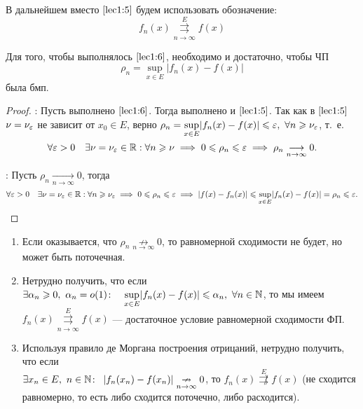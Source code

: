 \documentclass[../../main.tex]{subfiles}
\begin{document}
В дальнейшем вместо $\eqref{lec1:5}$ будем использовать обозначение:
\begin{equation}
\label{lec1:6}
f_n(x) \overset{E}{\underset{n \to \infty}\rightrightarrows} f(x)
\end{equation}
\begin{thm} 
Для того, чтобы выполнялось $\eqref{lec1:6}$, необходимо и достаточно, чтобы
ЧП \begin{equation}
\label{lec1:7}
\rho_n = \underset{x \in E}{\sup}|f_n(x) - f(x)| 
\end{equation} была бмп.
\end{thm}
\begin{proof}
 \;

 \nec: Пусть выполнено $\eqref{lec1:6}$. Тогда выполнено и $\eqref{lec1:5}$.
 Так как в $\eqref{lec1:5}$ $\nu = \nu_\varepsilon$ не зависит от $x_0 \in E$, 
 верно $ \rho_n = \underset{x \in E}{\sup}|f_n(x) - f(x)| \leq \eps,\ 
 \forall n \geq \nu_\eps$, т.~е.
 \[\forall \varepsilon > 0 \quad \exists \nu = \nu_\varepsilon \in \mathbb{R} : 
 \forall n \geqslant \nu \implies 
 0 \leqslant \rho_n \leqslant \varepsilon \implies 
 \rho_n \underset{n \to \infty}{\longrightarrow}0.\]

 \suff: Пусть $\rho_n \underset{n \to \infty}{\longrightarrow}0$, тогда
\[\forall \varepsilon > 0 \quad \exists \nu = \nu_\varepsilon \in \mathbb{R} :
\forall n \geqslant \nu_\varepsilon \implies  
0 \leqslant \rho_n \leqslant \varepsilon \implies |f(x)-f_n(x)| \leqslant 
\underset{x \in E}{\sup}|f_n(x) - f(x)|
= \rho_n \leqslant \varepsilon. \qedhere\]
\end{proof}

\begin{rems}
	\;
	
\begin{enumerate}
	
\item Если оказывается, что 
$\rho_n \underset{n \to \infty}{\not \rightarrow}0$, 
то равномерной сходимости не будет, но может быть поточечная.

\item Нетрудно получить, что если $\exists \alpha_n \geq 0, \ 
\alpha_n = o(1) \colon \quad \underset{x \in E}{\sup}|f_n(x) - f(x)| 
\leq \alpha_n,\ \forall n \in \N$, то мы имеем
$f_n(x) \overset{E}{\underset{n \to \infty}\rightrightarrows} f(x)$ ---
достаточное условие равномерной сходимости ФП.

\item Используя правило де Моргана 
построения отрицаний, нетрудно получить,
что если \\ $\exists x_n \in E,\ n \in \N \colon \ 
\left|f_n(x_n) - f(x_n)\right| \underset{n \to \infty}{\nrightarrow}0$,
то $f_n(x) \overset{E}{\not \rightrightarrows} f(x)$ (не сходится 
равномерно, то есть либо сходится поточечно, либо расходится).

\end{enumerate}	

\end{rems}	
\end{document}
